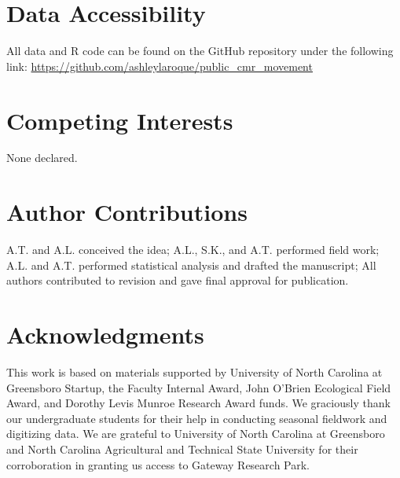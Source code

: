 \documentclass[11pt, class=article, crop=false]{standalone}
\begin{document}


\newpage

\section*{Data Accessibility}
All data and R code can be found on the GitHub repository under the following link: \url{https://github.com/ashleylaroque/public_cmr_movement}

\section*{Competing Interests}

None declared.

\section*{Author Contributions}

A.T. and A.L. conceived the idea; A.L., S.K., and A.T. performed  field work; A.L. and A.T. performed statistical analysis and drafted the manuscript; All authors contributed to revision and gave final approval for  publication.

\section*{Acknowledgments}

This work is based on materials supported by University of North Carolina at Greensboro Startup, the Faculty Internal Award, John O'Brien Ecological Field Award, and Dorothy Levis Munroe Research Award funds. We graciously thank our undergraduate students for their help in conducting seasonal fieldwork and digitizing data. We are grateful to University of North Carolina at Greensboro and North Carolina Agricultural and Technical State University for their corroboration in granting us access to Gateway Research Park. 
\end{document}
